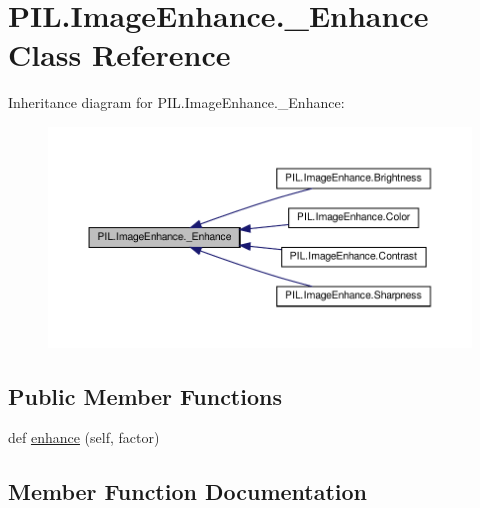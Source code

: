 \hypertarget{classPIL_1_1ImageEnhance_1_1__Enhance}{}\section{P\+I\+L.\+Image\+Enhance.\+\_\+\+Enhance Class Reference}
\label{classPIL_1_1ImageEnhance_1_1__Enhance}


Inheritance diagram for P\+I\+L.\+Image\+Enhance.\+\_\+\+Enhance\+:
\nopagebreak
\begin{figure}[H]
\begin{center}
\leavevmode
\includegraphics[width=350pt]{classPIL_1_1ImageEnhance_1_1__Enhance__inherit__graph}
\end{center}
\end{figure}
\subsection*{Public Member Functions}
\begin{DoxyCompactItemize}
\item 
def \hyperlink{classPIL_1_1ImageEnhance_1_1__Enhance_a92b6cf971b020a1cd7003a7b82d44848}{enhance} (self, factor)
\end{DoxyCompactItemize}


\subsection{Member Function Documentation}
\mbox{\label{classPIL_1_1ImageEnhance_1_1__Enhance_a92b6cf971b020a1cd7003a7b82d44848}} 
